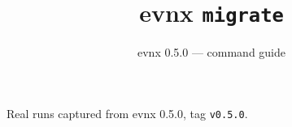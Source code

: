 \documentclass[aspectratio=169,10pt]{beamer}
\title{evnx \texttt{migrate}}
\subtitle{evnx 0.5.0 — command guide}
\date{}
\begin{document}
\begin{frame}[plain]\titlepage
  \begin{center}\footnotesize
  \textcolor{evnxMuted}{Real runs captured from evnx 0.5.0, tag \texttt{v0.5.0}.}
  \end{center}
\end{frame}

\end{document}
